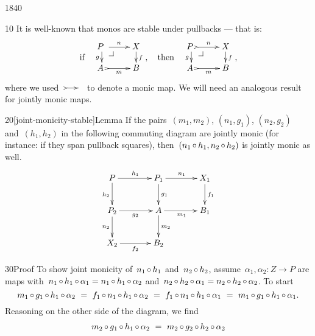 \begin{parsec}{1840}%
\begin{point}{10}%
It is well-known that monos are stable under pullbacks ---
that is:
\begin{equation*}
    \text{if} \quad
    \vcenter{\vbox{\xymatrix@R-1pc{
                {P\ } \pullback \ar[r]^n \ar[d]_g
        & X \ar[d]^f
                \\ {A\ } \ar@{>->}[r]_{m}
    & B}}} ,
    \quad \text{then} \quad
    \vcenter{\vbox{\xymatrix@R-1pc{
                {P\ } \pullback \ar@{>->}[r]^n \ar[d]_g
        & X \ar[d]^f
                \\ {A\ } \ar@{>->}[r]_{m}
    & B}}},
\end{equation*}
    where we used~$\xymatrix@C-1pc{\ar@{>->}[r]&}$ to denote a monic map.
We will need an analogous result for jointly monic maps.
\end{point}
\begin{point}{20}[joint-monicity-stable]{Lemma}%
If the pairs~$(m_1,m_2)$, $(n_1,g_1)$, $(n_2,g_2)$ and~$(h_1,h_2)$
in the following commuting diagram
are jointly monic (for instance: if they span pullback squares),
then~$(n_1 \mathop{\circ} h_1, n_2 \mathop{\circ} h_2)$ is jointly monic as well.
\begin{equation*}
    \xymatrix@C+1pc{
        P \ar[r]^{h_1} \ar[d]_{h_2}
        &P_1\ar[r]^{n_1} \ar[d]^{g_1}
        &X_1 \ar[d]^{f_1}
        \\ P_2\ar[r]_{g_2} \ar[d]_{n_2}
        & A \ar[r]_{m_1} \ar[d]^{m_2}
        & B_1 
        \\ X_2 \ar[r]_{f_2}
        & B_2
    }
\end{equation*}
\begin{point}{30}{Proof}%
To show joint monicity of~$n_1 \mathop{\circ} h_1$ and~$n_2 \mathop{\circ} h_2$,
assume~$\alpha_1,\alpha_2  \colon Z \to P$
    are maps with~$
        n_1 \mathop{\circ} h_1 \mathop{\circ} \alpha_1
        = n_1 \mathop{\circ} h_1 \mathop{\circ} \alpha_2$
    and~$n_2 \mathop{\circ} h_2 \mathop{\circ} \alpha_1
        = n_2 \mathop{\circ} h_2 \mathop{\circ} \alpha_2$.
To start
\begin{equation*}
    m_1 \mathop{\circ} g_1 \mathop{\circ} h_1 \mathop{\circ} \alpha_2
    \ =\  f_1 \mathop{\circ} n_1 \mathop{\circ} h_1 \mathop{\circ} \alpha_2 
    \ =\  f_1 \mathop{\circ} n_1 \mathop{\circ} h_1 \mathop{\circ} \alpha_1 
            \ =\  m_1 \mathop{\circ} g_1 \mathop{\circ} h_1 \mathop{\circ} \alpha_1.
\end{equation*}
Reasoning on the other side of the diagram, we find
\begin{align*}
    m_2 \after g_1 \after h_1 \after \alpha_2
    &\ =\  m_2 \after g_2 \after h_2 \after \alpha_2 \\ 

\end{align*}
\end{point}
\end{point}
\end{parsec}
